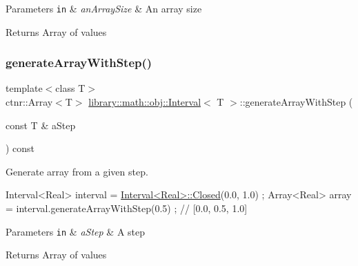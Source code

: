 \begin{DoxyParams}[1]{Parameters}
\mbox{\tt in}  & {\em an\+Array\+Size} & An array size \\
\hline
\end{DoxyParams}
\begin{DoxyReturn}{Returns}
Array of values 
\end{DoxyReturn}
\mbox{\label{classlibrary_1_1math_1_1obj_1_1_interval_aef3fddb9522a6e976499436e156bfe1d}} 
\subsubsection{\texorpdfstring{generate\+Array\+With\+Step()}{generateArrayWithStep()}}
{\footnotesize\ttfamily template$<$class T$>$ \\
ctnr\+::\+Array$<$T$>$ \hyperlink{classlibrary_1_1math_1_1obj_1_1_interval}{library\+::math\+::obj\+::\+Interval}$<$ T $>$\+::generate\+Array\+With\+Step (\begin{DoxyParamCaption}\item[{const T \&}]{a\+Step }\end{DoxyParamCaption}) const}



Generate array from a given step. 


\begin{DoxyCode}
Interval<Real> interval = \hyperlink{classlibrary_1_1math_1_1obj_1_1_interval_aae8bb2b89af450729338d48563def4d7}{Interval<Real>::Closed}(0.0, 1.0) ;
Array<Real> array = interval.generateArrayWithStep(0.5) ; \textcolor{comment}{// [0.0, 0.5, 1.0]}
\end{DoxyCode}



\begin{DoxyParams}[1]{Parameters}
\mbox{\tt in}  & {\em a\+Step} & A step \\
\hline
\end{DoxyParams}
\begin{DoxyReturn}{Returns}
Array of values 
\end{DoxyReturn}
\mbox{\label{classlibrary_1_1math_1_1obj_1_1_interval_a2f23ca14d71c454417270218132423de}} 
